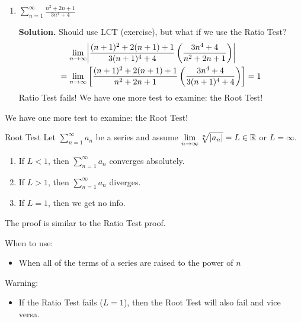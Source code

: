 \begin{Example}{}{}
\begin{enumerate}[label=(\roman*)]
              \textbf{Solution.} ``Almost geometric,'' Ratio Test:
              \[ \lim\limits_{{n} \to {\infty}}
                  \abs*{\frac{(n+1)^2+3(n+1)}{5^{n+1}}
                      \left( \frac{5^n}{n^2+3n} \right)}
                  =\lim\limits_{{n} \to {\infty}} \frac{1}{5} \left( \frac{n^2+2n+1+3n+3}{n^2+3n} \right)
                  =\frac{1}{5}
                  <1 \]
              So, the series \emph{converges absolutely}.
        \item $ \displaystyle \sum\limits_{n=1}^{\infty} \frac{n^2+2n+1}{3n^4+4} $

              \textbf{Solution.} Should use LCT (exercise), but what if we use the Ratio Test?
              \begin{align*}
                  \lim\limits_{{n} \to {\infty}}  &
                  \abs*{\frac{(n+1)^2+2(n+1)+1}{3(n+1)^4+4}
                  \left( \frac{3n^4+4}{n^2+2n+1} \right)}                                    \\
                  =\lim\limits_{{n} \to {\infty}} & \left[ \frac{(n+1)^2+2(n+1)+1}{n^2+2n+1}
                      \left( \frac{3n^4+4}{3(n+1)^4+4} \right)  \right] =1
              \end{align*}
              Ratio Test fails! We have one more test to examine: the Root Test!
    \end{enumerate}
\end{Example}

We have one more test to examine: the Root Test!

\begin{Theorem}{Root Test}{}
    Let $ \sum\limits_{n=1}^{\infty} a_n $ be a series and assume $ \lim\limits_{{n} \to {\infty}}
        \sqrt[n]{\lvert a_n\rvert}=L\in\mathbb{R} $ or $ L=\infty $.
    \begin{enumerate}[label=(\arabic*)]
        \item If $ L<1 $, then $ \sum\limits_{n=1}^{\infty} a_n $ converges absolutely.
        \item If $ L>1 $, then $ \sum\limits_{n=1}^{\infty} a_n $ diverges.
        \item If $ L=1 $, then we get no info.
    \end{enumerate}
\end{Theorem}
The proof is similar to the Ratio Test proof.

\begin{Remark}{}{}
    When to use:
    \begin{itemize}
        \item When all of the terms of a series are raised to the power of $ n $
    \end{itemize}
    Warning:
    \begin{itemize}
        \item If the Ratio Test fails ($ L=1 $), then the Root Test will also fail
              and vice versa.
    \end{itemize}
\end{Remark}

